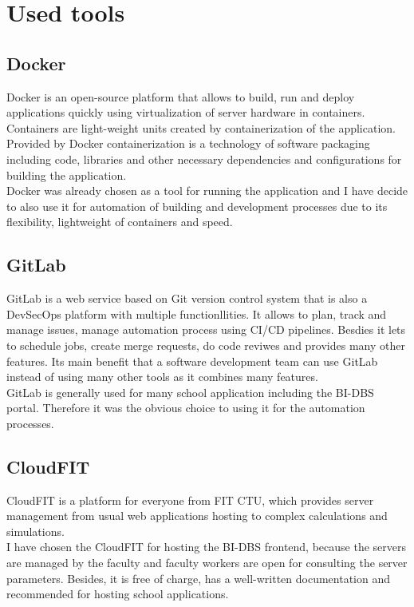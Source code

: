 \section{Used tools}

\subsection{Docker} Docker is an open-source platform that allows to build, run and deploy applications quickly using virtualization of server hardware in containers. Containers are light-weight units created by containerization of the application. Provided by Docker containerization is a technology of software packaging including code, libraries and other necessary dependencies and configurations for building the application.\\
Docker was already chosen as a tool for running the application and I have decide to also use it for automation of building and development processes due to its flexibility, lightweight of containers and speed.

\subsection{GitLab} GitLab is a web service based on Git version control system that is also a DevSecOps platform with multiple functionllities. It allows to plan, track and manage issues, manage automation process using CI/CD pipelines. Besdies it lets to schedule jobs, create merge requests, do code reviwes and provides many other features. Its main benefit that a software development team can use GitLab instead of using many other tools as it combines many features.\\
GitLab is generally used for many school application including the BI-DBS portal. Therefore it was the obvious choice to using it for the automation processes.

\subsection{CloudFIT} CloudFIT is a platform for everyone from FIT CTU, which provides server management from usual web applications hosting to complex calculations and simulations.\\
I have chosen the CloudFIT for hosting the BI-DBS frontend, because the servers are managed by the faculty and faculty workers are open for consulting the server parameters. Besides, it is free of charge, has a well-written documentation and recommended for hosting school applications. 

